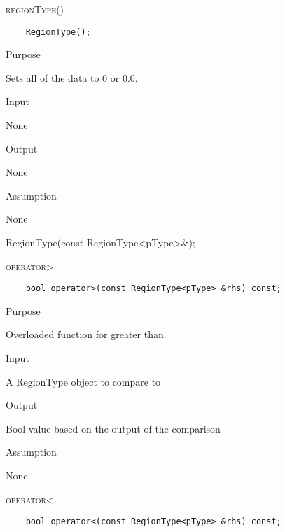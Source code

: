 \documentclass[pdftex, 11pt]{article}
\begin{document}
\begin{description}

	\item{\textsc{regionType()}}
		\begin{description}
\begin{lstlisting}
	RegionType();
\end{lstlisting}

			\item{Purpose}

				Sets all of the data to 0 or 0.0.

			\item{Input}

				None

			\item{Output}

				None

			\item{Assumption}

				None

		\end{description}

		RegionType(const RegionType<pType>\&);
	\item{\textsc{operator>}}
		\begin{description}
\begin{lstlisting}
	bool operator>(const RegionType<pType> &rhs) const;
\end{lstlisting}

			\item{Purpose}

				Overloaded function for greater than.

			\item{Input}

				A RegionType object to compare to

			\item{Output}

				Bool value based on the output of the comparison

			\item{Assumption}

				None

		\end{description}

	\item{\textsc{operator<}}
		\begin{description}
\begin{lstlisting}
	bool operator<(const RegionType<pType> &rhs) const;
\end{lstlisting}


\end{description}
\end{description}
\end{document}
